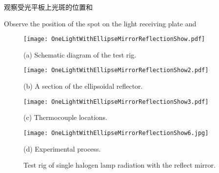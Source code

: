观察受光平板上光斑的位置和

Observe the position of the spot on the light receiving plate and

\begin{figure}
  \begin{minipage}[t]{0.5\linewidth} %
  \nonumber
    \centering
    \texttt{[image: OneLightWithEllipseMirrorReflectionShow.pdf]}
    \centerline{(a) Schematic diagram of the test rig.}
    \label{Fig:OneLightWithEllipseMirrorReflectionShow}
  \end{minipage}%
  \begin{minipage}[t]{0.5\linewidth}
    \centering
    \texttt{[image: OneLightWithEllipseMirrorReflectionShow2.pdf]}
    \centerline{(b) A section of the ellipsoidal reflector.}
    \label{Fig:OneLightWithEllipseMirrorReflectionShow2}
  \end{minipage}

  \begin{minipage}[t]{0.5\linewidth} %
  \nonumber
    \centering
    \texttt{[image: OneLightWithEllipseMirrorReflectionShow3.pdf]}
    \centerline{(c) Thermocouple locations.}
    \label{Fig:OneLightWithEllipseMirrorReflectionShow3}
  \end{minipage}%
  \begin{minipage}[t]{0.5\linewidth}
    \centering
    \texttt{[image: OneLightWithEllipseMirrorReflectionShow6.jpg]}
    \centerline{(d) Experimental process.}
    \label{Fig:OneLightWithEllipseMirrorReflectionShow6}
  \end{minipage}


  \caption{Test rig of single halogen lamp radiation with the reflect mirror.}
  \label{Fig:OneLightWithEllipseMirrorReflectionShow}
\end{figure}

